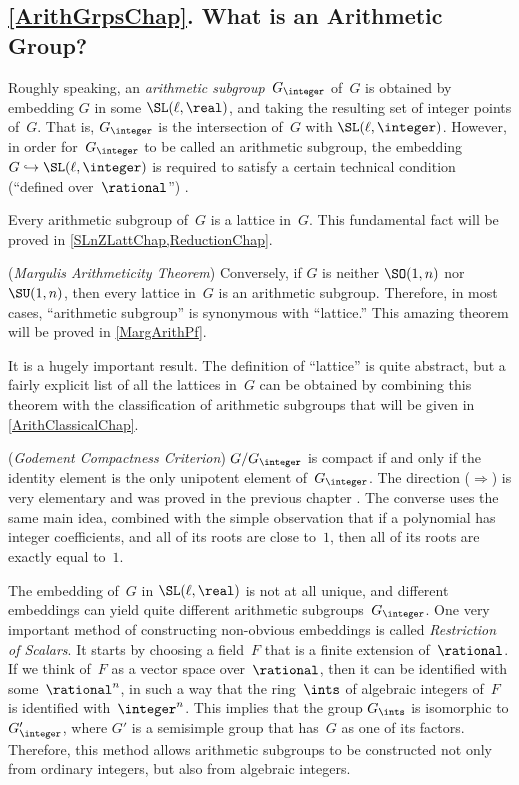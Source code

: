 \subsection*{\cref{ArithGrpsChap}. What is an Arithmetic Group?} 
Roughly speaking, an \emph{arithmetic subgroup}~$G_\integer$ of~$G$ is obtained by embedding $G$ in some $\SL(\ell,\real)$, and taking the resulting set of integer points of~$G$. That is, $G_\integer$ is the intersection of~$G$ with $\SL(\ell,\integer)$. However, in order for~$G_\integer$ to be called an arithmetic subgroup, the embedding $G \hookrightarrow \SL(\ell,\integer)$ is required to satisfy a certain technical condition (``defined over~$\rational$'') .

\smallbreak

 Every arithmetic subgroup of~$G$ is a lattice in~$G$. This fundamental fact will be proved in \cref{SLnZLattChap,ReductionChap}.

\smallbreak

 (\emph{Margulis Arithmeticity Theorem})
Conversely, if $G$ is neither $\SO(1,n)$ nor $\SU(1,n)$, then every lattice in~$G$ is an arithmetic subgroup. Therefore, in most cases, ``arithmetic subgroup'' is synonymous with ``lattice\zz.''
This amazing theorem will be proved in \cref{MargArithPf}.

It is a hugely important result. The definition of ``lattice'' is quite abstract, but a fairly explicit list of all the lattices in~$G$ can be obtained by combining this theorem with the classification of arithmetic subgroups that will be given in \cref{ArithClassicalChap}.


\smallbreak

 (\emph{Godement Compactness Criterion}) 
$G/G_\integer$ is compact if and only if the identity element is the only unipotent element of~$G_\integer$. The direction ($\Rightarrow$) is very elementary and was proved in the previous chapter . The converse uses the same main idea, combined with the simple observation that if a polynomial has integer coefficients, and all of its roots are close to~$1$, then all of its roots are exactly equal to~$1$.

\smallbreak

 The embedding of~$G$ in $\SL(\ell,\real)$ is not at all unique, and different embeddings can yield quite different arithmetic subgroups~$G_\integer$. One very important method of constructing non-obvious embeddings is called \emph{Restriction of Scalars}. It starts by choosing a field~$F$ that is a finite extension of~$\rational$. If we think of~$F$ as a vector space over~$\rational$, then it can be identified with some~$\rational^n$, in such a way that the ring~$\ints$ of algebraic integers of~$F$ is identified with~$\integer^n$. This implies that the group $G_{\ints}$ is isomorphic to $G'_\integer$, where $G'$ is a semisimple group that has~$G$ as one of its factors. Therefore, this method allows arithmetic subgroups to be constructed not only from ordinary integers, but also from algebraic integers.





